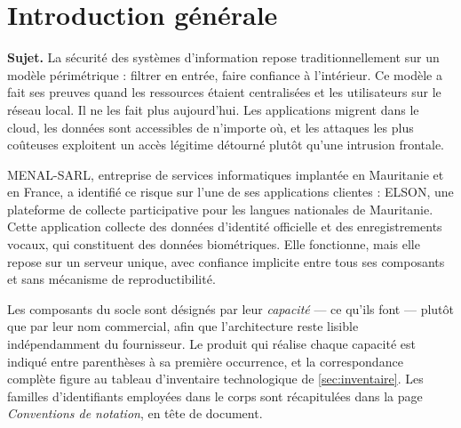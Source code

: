 \chapter*{Introduction générale}

\textbf{Sujet.} La sécurité des systèmes d'information repose traditionnellement sur un modèle
périmétrique : filtrer en entrée, faire confiance à l'intérieur. Ce modèle a fait ses preuves
quand les ressources étaient centralisées et les utilisateurs sur le réseau local. Il ne les
fait plus aujourd'hui. Les applications migrent dans le cloud, les données sont accessibles de
n'importe où, et les attaques les plus coûteuses exploitent un accès légitime détourné plutôt
qu'une intrusion frontale.

MENAL-SARL, entreprise de services informatiques implantée en Mauritanie et en France, a
identifié ce risque sur l'une de ses applications clientes : ELSON, une plateforme de collecte
participative pour les langues nationales de Mauritanie. Cette application collecte des données
d'identité officielle et des enregistrements vocaux, qui constituent des données biométriques.
Elle fonctionne, mais elle repose sur un serveur unique, avec confiance implicite entre tous ses
composants et sans mécanisme de reproductibilité.

\begin{keybox}[title={Convention de désignation}]
Les composants du socle sont désignés par leur \emph{capacité} --- ce qu'ils font --- plutôt que
par leur nom commercial, afin que l'architecture reste lisible indépendamment du fournisseur. Le
produit qui réalise chaque capacité est indiqué entre parenthèses à sa première occurrence, et la
correspondance complète figure au tableau d'inventaire technologique de
\cref{sec:inventaire}. Les
familles d'identifiants employées dans le corps sont récapitulées dans la page
\emph{Conventions de notation}, en tête de document.
\end{keybox}

